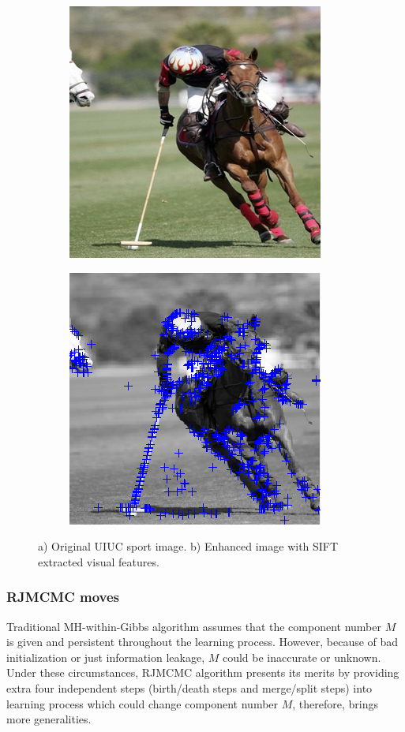 \documentclass[conference]{IEEEtran}
\begin{document}
\begin{figure}[b]
    \centering
    \begin{subfigure}[b]{0.2\paperwidth}
        \centering
        \includegraphics[width=0.15\paperwidth]{polo.jpg}
        \caption{}
    \end{subfigure}
    \begin{subfigure}[b]{0.2\textwidth}
        \centering
        \includegraphics[width=0.15\paperwidth]{polo_sift.png}
        \caption{}
    \end{subfigure}
    \caption{a) Original UIUC sport image. b) Enhanced image with SIFT extracted visual features.}\label{fig:2}
\end{figure}



\subsubsection*{RJMCMC moves}
Traditional MH-within-Gibbs algorithm assumes that the component number $M$ is given and persistent throughout the learning process. However, because of bad initialization or just information leakage, $M$ could be inaccurate or unknown. Under these circumstances, RJMCMC algorithm presents its merits by providing extra four independent steps (birth/death steps and merge/split steps) into learning process which could change component number $M$, therefore, brings more generalities. 
\end{document}
